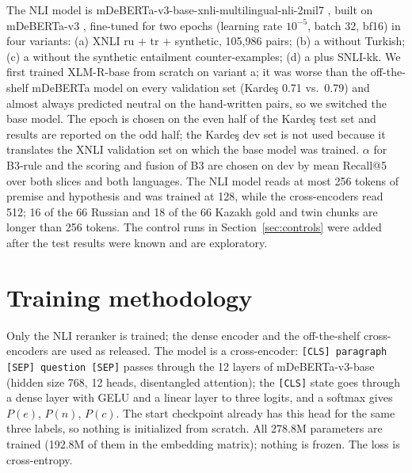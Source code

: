 \documentclass[11pt]{article}
\begin{document}
The NLI model is mDeBERTa-v3-base-xnli-multilingual-nli-2mil7 \citep{laurer2022less}, built on mDeBERTa-v3
\citep{he2023debertav3}, fine-tuned for two epochs (learning rate
$10^{-5}$, batch 32, bf16) in four variants: (a) XNLI ru + tr + synthetic, 105,986 pairs; (b) a without
Turkish; (c) a without the synthetic entailment counter-examples; (d) a plus SNLI-kk. We first trained
XLM-R-base from scratch on variant a; it was worse than the off-the-shelf mDeBERTa model on every validation
set (Karde\c{s} 0.71 vs.\ 0.79) and almost always predicted neutral on the hand-written pairs, so we switched
the base model. The epoch is chosen on the even half of the Karde\c{s} test set and results are reported on the
odd half; the Karde\c{s} dev set is not used because it translates the XNLI validation set on which the base
model was trained. $\alpha$ for B3-rule and the scoring and fusion of B3 are chosen on dev by mean Recall@5
over both slices and both languages. The NLI model reads at most 256 tokens of premise and hypothesis and was
trained at 128, while the cross-encoders read 512; 16 of the 66 Russian and 18 of the 66 Kazakh gold and twin
chunks are longer than 256 tokens. The control runs in Section~\ref{sec:controls} were added after the test results were
known and are exploratory.

\section{Training methodology}

Only the NLI reranker is trained; the dense encoder and the off-the-shelf cross-encoders are used as released.
The model is a cross-encoder: \texttt{[CLS] paragraph [SEP] question [SEP]} passes through the 12 layers of
mDeBERTa-v3-base (hidden size 768, 12 heads, disentangled attention); the \texttt{[CLS]} state goes through a
dense layer with GELU and a linear layer to three logits, and a softmax gives $P(e)$, $P(n)$, $P(c)$. The start
checkpoint already has this head for the same three labels, so nothing is initialized from scratch. All
278.8M parameters are trained (192.8M of them in the embedding matrix); nothing is frozen. The loss is
cross-entropy.
\end{document}

